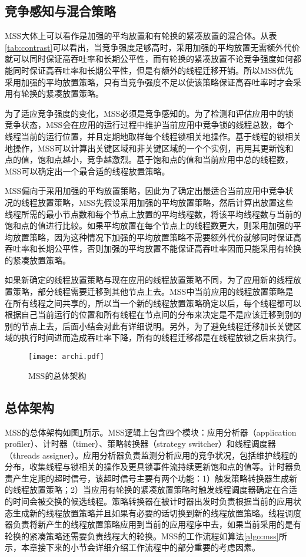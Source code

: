 \subsection{竞争感知与混合策略}
MSS大体上可以看作是加强的平均放置和有轮换的紧凑放置的混合体。从表\ref{tab:contrast}可以看出，当竞争强度足够高时，采用加强的平均放置无需额外代价就可以同时保证高吞吐率和长期公平性，而有轮换的紧凑放置不论竞争强度如何都能同时保证高吞吐率和长期公平性，但是有额外的线程迁移开销。所以MSS优先采用加强的平均放置策略，只有当竞争强度不足以使该策略保证高吞吐率时才会采用有轮换的紧凑放置策略。

为了适应竞争强度的变化，MSS必须是竞争感知的。为了检测和评估应用中的锁竞争状态，MSS会在应用的运行过程中维护当前应用中竞争锁的线程总数，每个线程当前的运行位置，并且定期地取样每个线程锁相关地操作。基于线程的锁相关地操作，MSS可以计算出关键区域和非关键区域的一个个实例，再用其更新饱和点的值，饱和点越小，竞争越激烈。基于饱和点的值和当前应用中总的线程数，MSS可以确定出一个最合适的线程放置策略。

MSS偏向于采用加强的平均放置策略，因此为了确定出最适合当前应用中竞争状况的线程放置策略，MSS先假设采用加强的平均放置策略，然后计算出放置这些线程所需的最小节点数和每个节点上放置的平均线程数，将该平均线程数与当前的饱和点的值进行比较。如果平均放置在每个节点上的线程数更大，则采用加强的平均放置策略，因为这种情况下加强的平均放置策略不需要额外代价就够同时保证高吞吐率和长期公平性，否则加强的平均放置不能保证高吞吐率因而只能采用有轮换的紧凑放置策略。

如果新确定的线程放置策略与现在应用的线程放置策略不同，为了应用新的线程放置策略，部分线程需要迁移到其他节点上去。MSS中当前应用的线程放置策略是在所有线程之间共享的，所以当一个新的线程放置策略确定以后，每个线程都可以根据自己当前运行的位置和所有线程在节点间的分布来决定是不是应该迁移到别的别的节点上去，后面小结会对此有详细说明。另外，为了避免线程迁移加长关键区域的执行时间进而造成吞吐率下降，所有的线程迁移都是在线程放锁之后来执行。

\begin{figure}[t]
	\centering
	\texttt{[image: archi.pdf]}
	\caption{MSS的总体架构}
	\label{Fig:archi}
\end{figure}

\subsection{总体架构}
MSS的总体架构如图\ref{Fig:archi}所示。MSS逻辑上包含四个模块：应用分析器（application profiler）、计时器（timer）、策略转换器（strategy switcher）和线程调度器（threads assigner）。应用分析器负责监测分析应用的竞争状况，包括维护线程的分布，收集线程与锁相关的操作及更具锁事件流持续更新饱和点的值等。计时器负责产生定期的超时信号，该超时信号主要有两个功能：1）触发策略转换器生成新的线程放置策略；2）当应用有轮换的紧凑放置策略时触发线程调度器确定在合适的时间会被交换的候选线程。策略转换器在被计时器出发时负责根据当前的应用状态生成新的线程放置策略并且如果有必要的话切换到新的线程放置策略。线程调度器负责将新产生的线程放置策略应用到当前的应用程序中去，如果当前采用的是有轮换的紧凑策略还需要负责线程大的轮换。MSS的工作流程如算法\ref{algo:mss}所示，本章接下来的小节会详细介绍工作流程中的部分重要的考虑因素。


